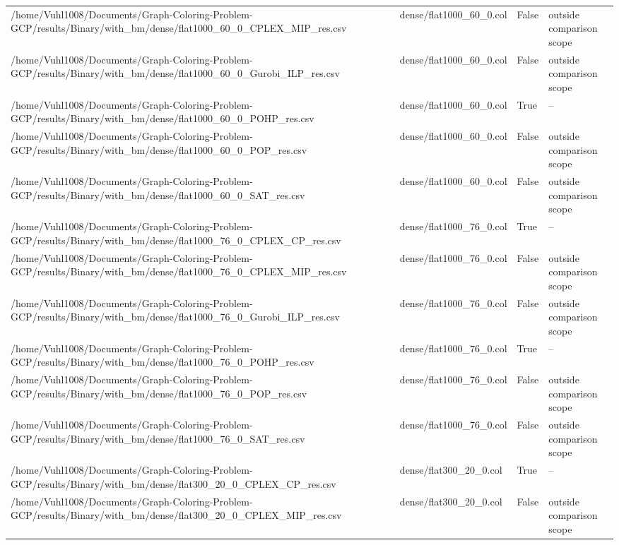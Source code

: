 \begin{table}[htbp]
\begin{tabular}{llll}
/home/Vuhl1008/Documents/Graph-Coloring-Problem-GCP/results/Binary/with\_bm/dense/flat1000\_60\_0\_CPLEX\_MIP\_res.csv & dense/flat1000\_60\_0.col & False & outside comparison scope \\
/home/Vuhl1008/Documents/Graph-Coloring-Problem-GCP/results/Binary/with\_bm/dense/flat1000\_60\_0\_Gurobi\_ILP\_res.csv & dense/flat1000\_60\_0.col & False & outside comparison scope \\
/home/Vuhl1008/Documents/Graph-Coloring-Problem-GCP/results/Binary/with\_bm/dense/flat1000\_60\_0\_POHP\_res.csv & dense/flat1000\_60\_0.col & True & -- \\
/home/Vuhl1008/Documents/Graph-Coloring-Problem-GCP/results/Binary/with\_bm/dense/flat1000\_60\_0\_POP\_res.csv & dense/flat1000\_60\_0.col & False & outside comparison scope \\
/home/Vuhl1008/Documents/Graph-Coloring-Problem-GCP/results/Binary/with\_bm/dense/flat1000\_60\_0\_SAT\_res.csv & dense/flat1000\_60\_0.col & False & outside comparison scope \\
/home/Vuhl1008/Documents/Graph-Coloring-Problem-GCP/results/Binary/with\_bm/dense/flat1000\_76\_0\_CPLEX\_CP\_res.csv & dense/flat1000\_76\_0.col & True & -- \\
/home/Vuhl1008/Documents/Graph-Coloring-Problem-GCP/results/Binary/with\_bm/dense/flat1000\_76\_0\_CPLEX\_MIP\_res.csv & dense/flat1000\_76\_0.col & False & outside comparison scope \\
/home/Vuhl1008/Documents/Graph-Coloring-Problem-GCP/results/Binary/with\_bm/dense/flat1000\_76\_0\_Gurobi\_ILP\_res.csv & dense/flat1000\_76\_0.col & False & outside comparison scope \\
/home/Vuhl1008/Documents/Graph-Coloring-Problem-GCP/results/Binary/with\_bm/dense/flat1000\_76\_0\_POHP\_res.csv & dense/flat1000\_76\_0.col & True & -- \\
/home/Vuhl1008/Documents/Graph-Coloring-Problem-GCP/results/Binary/with\_bm/dense/flat1000\_76\_0\_POP\_res.csv & dense/flat1000\_76\_0.col & False & outside comparison scope \\
/home/Vuhl1008/Documents/Graph-Coloring-Problem-GCP/results/Binary/with\_bm/dense/flat1000\_76\_0\_SAT\_res.csv & dense/flat1000\_76\_0.col & False & outside comparison scope \\
/home/Vuhl1008/Documents/Graph-Coloring-Problem-GCP/results/Binary/with\_bm/dense/flat300\_20\_0\_CPLEX\_CP\_res.csv & dense/flat300\_20\_0.col & True & -- \\
/home/Vuhl1008/Documents/Graph-Coloring-Problem-GCP/results/Binary/with\_bm/dense/flat300\_20\_0\_CPLEX\_MIP\_res.csv & dense/flat300\_20\_0.col & False & outside comparison scope \\

\end{tabular}
\end{table}
